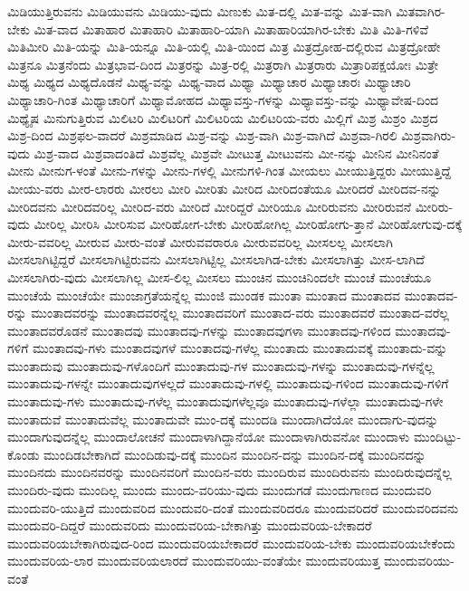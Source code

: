 {ಮಿಡಿಯುತ್ತಿರುವನು
ಮಿಡಿಯುವನು
ಮಿಡಿಯು-ವುದು
ಮಿಣುಕು
ಮಿತ-ದಲ್ಲಿ
ಮಿತ-ವನ್ನು
ಮಿತ-ವಾಗಿ
ಮಿತವಾಗಿರ-ಬೇಕು
ಮಿತ-ವಾದ
ಮಿತಾಹಾರ
ಮಿತಾಹಾರಿ
ಮಿತಾಹಾರಿ-ಯಾಗಿ
ಮಿತಾಹಾರಿಯಾಗಿರ-ಬೇಕು
ಮಿತಿ
ಮಿತಿ-ಗಳಿವೆ
ಮಿತಿಮೀರಿ
ಮಿತಿ-ಯನ್ನು
ಮಿತಿ-ಯನ್ನೂ
ಮಿತಿ-ಯಲ್ಲಿ
ಮಿತಿ-ಯಿಂದ
ಮಿತ್ರ
ಮಿತ್ರದ್ರೋಹ-ದಲ್ಲಿರುವ
ಮಿತ್ರದ್ರೋಹೇ
ಮಿತ್ರನೂ
ಮಿತ್ರನೆಂದು
ಮಿತ್ರಭಾವ-ದಿಂದ
ಮಿತ್ರರನ್ನು
ಮಿತ್ರ-ರಲ್ಲಿ
ಮಿತ್ರರಾಗಿ
ಮಿತ್ರರಾರು
ಮಿತ್ರಾರಿಪಕ್ಷಯೋಃ
ಮಿತ್ರೇ
ಮಿಥ್ಯ
ಮಿಥ್ಯದ
ಮಿಥ್ಯದೊಡನೆ
ಮಿಥ್ಯ-ವನ್ನು
ಮಿಥ್ಯ-ವಾದ
ಮಿಥ್ಯಾ
ಮಿಥ್ಯಾಚಾರ
ಮಿಥ್ಯಾಚಾರಃ
ಮಿಥ್ಯಾಚಾರಿ
ಮಿಥ್ಯಾಚಾರಿ-ಗಿಂತ
ಮಿಥ್ಯಾಚಾರಿಗೆ
ಮಿಥ್ಯಾಮೋಹದ
ಮಿಥ್ಯಾವಸ್ತು-ಗಳನ್ನು
ಮಿಥ್ಯಾವಸ್ತು-ವನ್ನು
ಮಿಥ್ಯಾವೇಷ-ದಿಂದ
ಮಿಥ್ಯೈಷ
ಮಿನುಗುತ್ತಿರುವ
ಮಿಲಿಟರಿ
ಮಿಲಿಟರಿಗೆ
ಮಿಲಿಟರಿಯ
ಮಿಲಿಟರಿಯ-ವರು
ಮಿಲ್ಲಿಗೆ
ಮಿಶ್ರ
ಮಿಶ್ರಂ
ಮಿಶ್ರದ
ಮಿಶ್ರ-ದಿಂದ
ಮಿಶ್ರಫಲ-ವಾದರೆ
ಮಿಶ್ರಮಾಡಿದ
ಮಿಶ್ರ-ವನ್ನು
ಮಿಶ್ರ-ವಾಗಿ
ಮಿಶ್ರ-ವಾಗಿದೆ
ಮಿಶ್ರವಾ-ಗಿರಲಿ
ಮಿಶ್ರವಾಗಿರು-ವುದು
ಮಿಶ್ರ-ವಾದ
ಮಿಶ್ರವಾದಂತಿದೆ
ಮಿಶ್ರವೆಲ್ಲ
ಮಿಶ್ರವೇ
ಮೀಟುತ್ತ
ಮೀಟುವನು
ಮೀ-ನನ್ನು
ಮೀನಿನ
ಮೀನಿನಂತೆ
ಮೀನು
ಮೀನುಗ-ಳಂತೆ
ಮೀನು-ಗಳನ್ನು
ಮೀನು-ಗಳಲ್ಲಿ
ಮೀನುಗಳಿ-ಗಿಂತ
ಮೀಯಲು
ಮೀಯುತ್ತಿದ್ದರು
ಮೀಯುತ್ತಿದ್ದೆ
ಮೀಯು-ವರು
ಮೀರ-ಲಾರರು
ಮೀರಲು
ಮೀರಿ
ಮೀರಿತು
ಮೀರಿದ
ಮೀರಿದಂತೆಯೂ
ಮೀರಿದರೆ
ಮೀರಿದವ-ನನ್ನು
ಮೀರಿದವನು
ಮೀರಿದವರಿಲ್ಲ
ಮೀರಿದ-ವರು
ಮೀರಿದೆ
ಮೀರಿದ್ದರೆ
ಮೀರಿಯೂ
ಮೀರಿರುವನು
ಮೀರಿರುವನೆ
ಮೀರಿರು-ವುದು
ಮೀರಿಲ್ಲ
ಮೀರಿಸಿ
ಮೀರಿಸುವ
ಮೀರಿಹೋಗ-ಬೇಕು
ಮೀರಿಹೋಗಿಲ್ಲ
ಮೀರಿಹೋಗು-ತ್ತಾನೆ
ಮೀರಿಹೋಗುವು-ದಕ್ಕೆ
ಮೀರು-ವವರಿಲ್ಲ
ಮೀರುವ
ಮೀರು-ವಂತೆ
ಮೀರುವವರಾರೂ
ಮೀರುವವರಿಲ್ಲ
ಮೀಸಲಲ್ಲ
ಮೀಸಲಾಗಿ
ಮೀಸಲಾಗಿಟ್ಟಿದ್ದರೆ
ಮೀಸಲಾಗಿಟ್ಟಿರುವನು
ಮೀಸಲಾಗಿಟ್ಟಿಲ್ಲ
ಮೀಸಲಾಗಿಡ-ಬೇಕು
ಮೀಸಲಾಗಿತ್ತು
ಮೀಸ-ಲಾಗಿದೆ
ಮೀಸಲಾಗಿರು-ವುದು
ಮೀಸಲಾಗಿಲ್ಲ
ಮೀಸ-ಲಿಲ್ಲ
ಮೀಸಲು
ಮುಂಚಿನ
ಮುಂಚಿನಿಂದಲೇ
ಮುಂಚೆ
ಮುಂಚೆಯೂ
ಮುಂಚೆಯೆ
ಮುಂಚೆಯೇ
ಮುಂಜಾಗ್ರತೆಯನ್ನೆಲ್ಲ
ಮುಂಜಿ
ಮುಂಡಕ
ಮುಂತಾ
ಮುಂತಾದ
ಮುಂತಾದವ
ಮುಂತಾದವ-ರನ್ನು
ಮುಂತಾದವರನ್ನು
ಮುಂತಾದವರನ್ನೆಲ್ಲ
ಮುಂತಾದವರಿಗೆ
ಮುಂತಾದ-ವರು
ಮುಂತಾದವರೆ
ಮುಂತಾದ-ವರೆಲ್ಲ
ಮುಂತಾದವರೊಡನೆ
ಮುಂತಾದವು
ಮುಂತಾದವು-ಗಳನ್ನು
ಮುಂತಾದವುಗಳಾ
ಮುಂತಾದವು-ಗಳಿಂದ
ಮುಂತಾದವು-ಗಳಿಗೆ
ಮುಂತಾದವು-ಗಳು
ಮುಂತಾದವುಗಳೆ
ಮುಂತಾದವು-ಗಳೆಲ್ಲ
ಮುಂತಾದು
ಮುಂತಾದುವಕ್ಕೆ
ಮುಂತಾದು-ವನ್ನು
ಮುಂತಾದುವು
ಮುಂತಾದುವು-ಗಳೊಂದಿಗೆ
ಮುಂತಾದುವು-ಗಳ
ಮುಂತಾದುವು-ಗಳನ್ನು
ಮುಂತಾದುವು-ಗಳನ್ನೆಲ್ಲ
ಮುಂತಾದುವು-ಗಳನ್ನೇ
ಮುಂತಾದುವುಗಳಲ್ಲದೆ
ಮುಂತಾದುವು-ಗಳಲ್ಲಿ
ಮುಂತಾದುವು-ಗಳಿಂದ
ಮುಂತಾದುವು-ಗಳಿಗೆ
ಮುಂತಾದುವು-ಗಳು
ಮುಂತಾದುವು-ಗಳೆಲ್ಲ
ಮುಂತಾದುವುಗಳೆಲ್ಲವೂ
ಮುಂತಾದುವು-ಗಳೆಲ್ಲಾ
ಮುಂತಾದುವು-ಗಳೇ
ಮುಂತಾದುವೆ
ಮುಂತಾದುವೆಲ್ಲ
ಮುಂತಾದುವೇ
ಮುಂ-ದಕ್ಕೆ
ಮುಂದಡಿ
ಮುಂದಾಗಿದೆಯೋ
ಮುಂದಾಗು-ವುದನ್ನು
ಮುಂದಾಗುವುದನ್ನೆಲ್ಲ
ಮುಂದಾಲೋಚನೆ
ಮುಂದಾಳಾಗಿದ್ದಾನೆಯೋ
ಮುಂದಾಳಾಗಿರುವನೋ
ಮುಂದಾಳು
ಮುಂದಿಟ್ಟು-ಕೊಂಡು
ಮುಂದಿಡಬೇಕಾಗಿದೆ
ಮುಂದಿಡುವು-ದಕ್ಕೆ
ಮುಂದಿನ
ಮುಂದಿನ-ದನ್ನು
ಮುಂದಿನ-ದಕ್ಕೆ
ಮುಂದಿನದನ್ನು
ಮುಂದಿನದು
ಮುಂದಿನವರನ್ನು
ಮುಂದಿನವರಿಗೆ
ಮುಂದಿನ-ವರು
ಮುಂದಿರುವ
ಮುಂದಿರುವನು
ಮುಂದಿರುವುದನ್ನೆಲ್ಲ
ಮುಂದಿರು-ವುದು
ಮುಂದಿಲ್ಲ
ಮುಂದು
ಮುಂದು-ವರಿಯು-ವುದು
ಮುಂದುಗಡೆ
ಮುಂದುಗಾಣದ
ಮುಂದುವರಿ
ಮುಂದುವರಿ-ಯುತ್ತಿದೆ
ಮುಂದುವರಿದ
ಮುಂದುವರಿ-ದಂತೆ
ಮುಂದುವರಿದರೂ
ಮುಂದುವರಿದರೆ
ಮುಂದುವರಿದವನು
ಮುಂದುವರಿ-ದಿದ್ದರೆ
ಮುಂದುವರಿದು
ಮುಂದುವರಿಯ-ಬೇಕಾಗಿತ್ತು
ಮುಂದುವರಿಯ-ಬೇಕಾದರೆ
ಮುಂದುವರಿಯಬೇಕಾಗಿರುವುದ-ರಿಂದ
ಮುಂದುವರಿಯಬೇಕಾದರೆ
ಮುಂದುವರಿಯ-ಬೇಕು
ಮುಂದುವರಿಯಬೇಕೆಂದು
ಮುಂದುವರಿಯ-ಲಾರ
ಮುಂದುವರಿಯಲಾರದೆ
ಮುಂದುವರಿಯು-ವಂತೆಯೇ
ಮುಂದುವರಿಯುತ್ತ
ಮುಂದುವರಿಯು-ವಂತೆ
}
